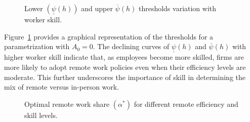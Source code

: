\documentclass[
  11pt,
  letterpaper,
  DIV=11,
  numbers=noendperiod]{scrartcl}
\theoremstyle{plain}
\theoremstyle{remark}
\begin{document}
\begin{figure}


\caption{\label{fig-elephant}Lower \((\underline{\psi}(h))\) and upper
\(\overline{\psi}(h)\) thresholds variation with worker skill.}

\end{figure}%

Figure~\ref{fig-elephant} provides a graphical representation of the
thresholds for a parametrization with \(A_{0} = 0\). The declining
curves of \(\underline{\psi}(h)\) and \(\overline{\psi}(h)\) with higher
worker skill indicate that, as employees become more skilled, firms are
more likely to adopt remote work policies even when their efficiency
levels are moderate. This further underscores the importance of skill in
determining the mix of remote versus in-person work.

\begin{figure}


\caption{\label{fig-el}Optimal remote work share \((\alpha^{*})\) for
different remote efficiency and skill levels.}

\end{figure}%
\end{document}
